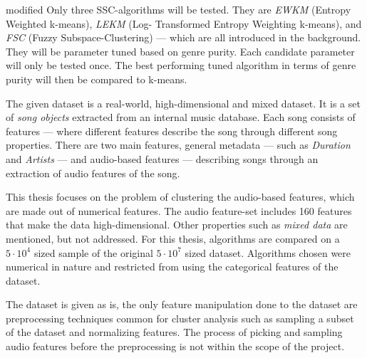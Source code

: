\documentclass[../report.tex]{subfiles}
\begin{document}
\begin{color}{modified}
  Only three SSC-algorithms will be tested. They are \textit{EWKM} (Entropy Weighted k-means), \textit{LEKM} (Log- Transformed Entropy Weighting k-means), and \textit{FSC} (Fuzzy Subspace-Clustering) --- which are all introduced in the background. They will be parameter tuned based on genre purity. Each candidate parameter will only be tested once. The best performing tuned algorithm in terms of genre purity will then be compared to k-means.
\end{color}



The given dataset is a real-world, high-dimensional and mixed dataset. It is a set of \textit{song objects} extracted from an internal music database. Each song consists of features --- where different features describe the song through different song properties. There are two main features, general metadata --- such as \textit{Duration} and \textit{Artists} --- and audio-based features --- describing songs through an extraction of audio features of the song.


This thesis focuses on the problem of clustering the audio-based features, which are made out of numerical features. The audio feature-set includes 160 features that make the data high-dimensional. Other properties such as \textit{mixed data} are mentioned, but not addressed. For this thesis, algorithms are compared on a $5 \cdot 10^4$ sized sample of the original $5 \cdot 10^7$ sized dataset. Algorithms chosen were numerical in nature and restricted from using the categorical features of the dataset.

The dataset is given as is, the only feature manipulation done to the dataset are preprocessing techniques common for cluster analysis such as sampling a subset of the dataset and normalizing features. The process of picking and sampling audio features before the preprocessing is not within the scope of the project.



\end{document}
